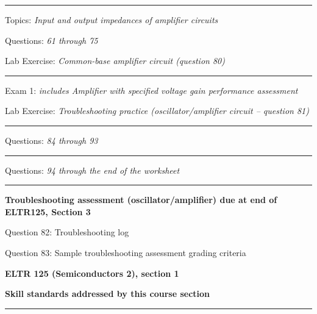 
\vskip 10pt
\hrule \vskip 5pt
\noindent
{}

\hskip 10pt Topics: {\it Input and output impedances of amplifier circuits}
 
\hskip 10pt Questions: {\it 61 through 75}
 
\hskip 10pt Lab Exercise: {\it Common-base amplifier circuit (question 80)}
 
\vskip 10pt
\hrule \vskip 5pt
\noindent
{}

\hskip 10pt Exam 1: {\it includes Amplifier with specified voltage gain performance assessment}
 
\hskip 10pt Lab Exercise: {\it Troubleshooting practice (oscillator/amplifier circuit -- question 81)}
  
\vskip 10pt
\hrule \vskip 5pt
\noindent
{}

\hskip 10pt Questions: {\it 84 through 93}
 
\vskip 10pt
\hrule \vskip 5pt
\noindent
{}

\hskip 10pt Questions: {\it 94 through the end of the worksheet}
 
\vskip 10pt
\hrule \vskip 5pt
\noindent
{}

\hskip 10pt {\bf Troubleshooting assessment (oscillator/amplifier) due at end of ELTR125, Section 3}

\hskip 10pt Question 82: Troubleshooting log
 
\hskip 10pt Question 83: Sample troubleshooting assessment grading criteria
 
\vskip 10pt










\vfil \eject

\centerline{\bf ELTR 125 (Semiconductors 2), section 1} \bigskip 
 
\vskip 10pt

\noindent
{\bf Skill standards addressed by this course section}

\vskip 5pt

\hrule \vskip 10pt
\noindent
{}

